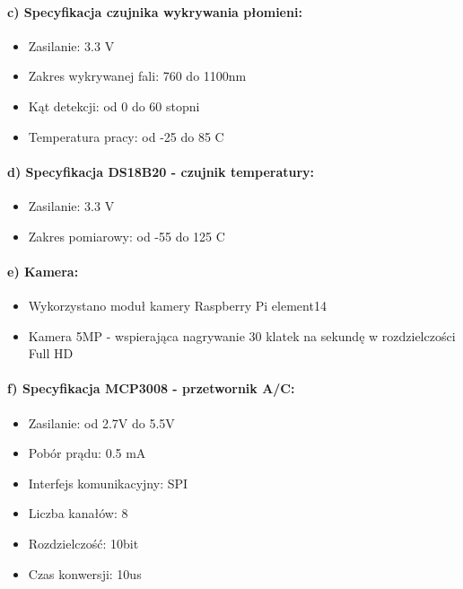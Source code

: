 \paragraph{c) Specyfikacja czujnika wykrywania płomieni:}
\begin{itemize} 
\item Zasilanie: 3.3 V
\item Zakres wykrywanej fali: 760 do 1100nm
\item Kąt detekcji: od 0 do 60 stopni
\item Temperatura pracy: od -25 do 85 \textdegree{}C
\end{itemize}

\paragraph{d) Specyfikacja DS18B20 - czujnik temperatury:}
\begin{itemize} 
\item Zasilanie: 3.3 V
\item Zakres pomiarowy: od -55 do 125 \textdegree{}C
\end{itemize}

\paragraph{e) Kamera:}
\begin{itemize} 
\item Wykorzystano moduł kamery Raspberry Pi element14
\item Kamera 5MP - wspierająca nagrywanie 30 klatek na sekundę w rozdzielczości Full HD
\end{itemize}

\paragraph{f) Specyfikacja MCP3008 - przetwornik A/C:}
\begin{itemize} 
\item Zasilanie: od 2.7V do 5.5V
\item Pobór prądu: 0.5 mA
\item Interfejs komunikacyjny: SPI
\item Liczba kanałów: 8
\item Rozdzielczość: 10bit
\item Czas konwersji: 10us
\end{itemize}


